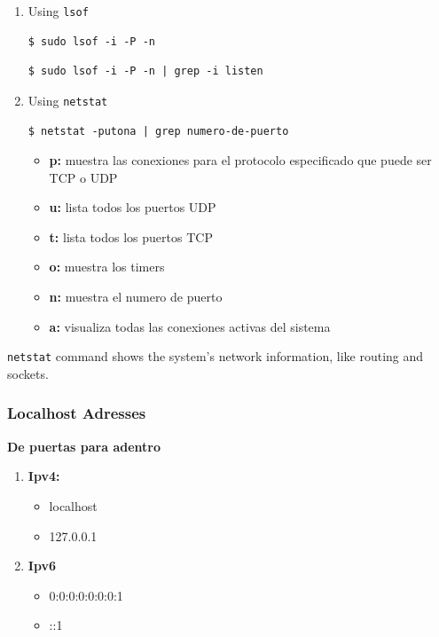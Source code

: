 \documentclass{article}
\newenvironment{blocktemplate}[1]{%
    \tcolorbox[beamer,%
    noparskip,breakable,
    colframe=Blue,%
    colbacklower=LimeGreen!75!LightGreen,%
    title=#1]}%
    {\endtcolorbox}
\newenvironment{codetemplate}[1][]{%
  \mybasecolorbox[#1]
  \itshape
}{%
  \endmybasecolorbox
}
\begin{document}
\begin{enumerate}
    \item Using \verb|lsof|
\begin{codetemplate}{}
\begin{verbatim}
$ sudo lsof -i -P -n
\end{verbatim}
\end{codetemplate}
\begin{codetemplate}{}
\begin{verbatim}
$ sudo lsof -i -P -n | grep -i listen
\end{verbatim}
\end{codetemplate}

    \item Using \verb|netstat|
\begin{codetemplate}{}
\begin{verbatim}
$ netstat -putona | grep numero-de-puerto
\end{verbatim}
\end{codetemplate}

\begin{itemize}
    \item \textbf{p:} muestra las conexiones para el protocolo especificado que puede ser TCP o UDP
    \item \textbf{u:} lista todos los puertos UDP
    \item \textbf{t:} lista todos los puertos TCP
    \item \textbf{o:} muestra los timers
    \item \textbf{n:} muestra el numero de puerto
    \item \textbf{a:} visualiza todas las conexiones activas del sistema
\end{itemize}
\end{enumerate}

\begin{blocktemplate}{NOTE}
\verb|netstat| command shows the system’s network information, like routing and sockets.
\end{blocktemplate}

\subsubsection{Localhost Adresses}

\textbf{De puertas para adentro}
\begin{enumerate}
    \item \textbf{Ipv4:}
    \begin{itemize}
        \item localhost
        \item 127.0.0.1
    \end{itemize}
    \item \textbf{Ipv6}
    \begin{itemize}
        \item 0:0:0:0:0:0:0:1
        \item ::1
    \end{itemize}
\end{enumerate}
\end{document}
